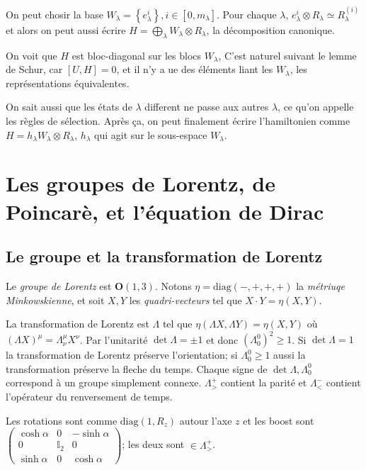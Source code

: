 \documentclass[10pt]{report}
\begin{document}
On peut chosir la base $W_\lambda = \left\{ e_\lambda^{i} \right\}, i \in [0, m_\lambda]$. Pour chaque $\lambda$, $e_\lambda^i \otimes R_\lambda \simeq R_\lambda^{(i)}$ et alors on peut aussi \'ecrire $H = \bigoplus_\lambda W_\lambda \otimes R_\lambda$, la d\'ecomposition canonique.

On voit que $H$ est bloc-diagonal sur les blocs $W_\lambda$, C'est naturel suivant le lemme de Schur, car $\left[ U,H \right] = 0$, et il n'y a ue des \'el\'ements liant les $W_\lambda$, les repr\'esentations \'equivalentes. 

On sait aussi que les \'etats de $\lambda$ different ne passe aux autres $\lambda$, ce qu'on appelle les r\`egles de s\'election. Apr\`es \c{c}a, on peut finalement \'ecrire l'hamiltonien comme $H = h_\lambda W_\lambda \otimes R_\lambda$, $h_\lambda$ qui agit sur le sous-espace $W_\lambda$. 
\section{Les groupes de Lorentz, de Poincar\`e, et l'\'equation de Dirac}

\subsection{Le groupe et la transformation de Lorentz}

Le \emph{groupe de Lorentz} est $\mathbf{O}(1,3)$. Notons $\eta = \mathrm{diag}(-,+,+,+)$ la \emph{m\'etriuqe Minkowskienne}, et soit $X,Y$ les \emph{quadri-vecteurs} tel que $X \cdot Y = \eta(X,Y)$.

La transformation de Lorentz est $\Lambda$ tel que $\eta(\Lambda X, \Lambda Y) = \eta(X, Y)$ o\`u $(\Lambda X)^\mu = \Lambda^\mu_\nu X^\nu$. Par l'unitarit\'e $\det \Lambda = \pm 1$ et donc $(\Lambda_0^0)^2 \geq 1$. Si $\det\Lambda = 1$ la transformation de Lorentz pr\'eserve l'orientation; si $\Lambda_0^0 \geq 1$ aussi la transformation pr\'eserve la fleche du temps. Chaque signe de $\det \Lambda, \Lambda_0^0$ correspond \`a un groupe simplement connexe. $\Lambda_>^+$ contient la parit\'e et $\Lambda_<^-$ contient l'op\'erateur du renversement de temps.

Les rotations sont comme $\mathrm{diag}(1, R_z)$ autour l'axe $z$ et les boost sont $\begin{pmatrix} \cosh \alpha & 0 & -\sinh \alpha \\0 & \mathbb{I}_2 & 0\\\sinh \alpha & 0 & \cosh \alpha \end{pmatrix}$; les deux sont $\in \Lambda_>^+$.
\end{document}
